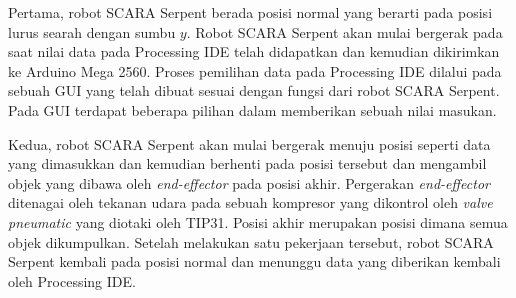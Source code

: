 Pertama, robot SCARA Serpent berada posisi normal yang berarti pada posisi lurus searah dengan sumbu $y$. Robot SCARA Serpent akan mulai bergerak pada saat nilai data pada Processing IDE telah didapatkan dan kemudian dikirimkan ke Arduino Mega 2560. Proses pemilihan data pada Processing IDE dilalui pada sebuah GUI yang telah dibuat sesuai dengan fungsi dari robot SCARA Serpent. Pada GUI terdapat beberapa pilihan dalam memberikan sebuah nilai masukan. 

Kedua, robot SCARA Serpent akan mulai bergerak menuju posisi seperti data yang dimasukkan dan kemudian berhenti pada posisi tersebut dan mengambil objek yang dibawa oleh \textit{end-effector} pada posisi akhir.  Pergerakan \textit{end-effector} ditenagai oleh tekanan udara pada sebuah kompresor yang dikontrol oleh\textit{ valve pneumatic} yang diotaki oleh TIP31. Posisi akhir merupakan posisi dimana semua objek dikumpulkan. Setelah melakukan satu pekerjaan tersebut, robot SCARA Serpent kembali pada posisi normal dan menunggu data yang diberikan kembali oleh Processing IDE.  



